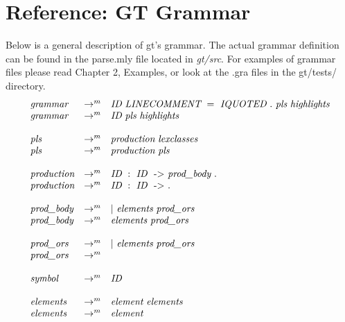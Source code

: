 \section{Reference: GT Grammar}

Below is a general description of gt's grammar. The actual grammar definition can be
found in the parse.mly file located in \textit{gt/src}. For examples of grammar files please
read Chapter 2, Examples, or look at the .gra files in the gt/tests/ directory. \\

\[
\begin{array}{lll}
\textit{grammar} & \to^m & \textit{ID}\ \textit{LINECOMMENT}\ =\ \textit{IQUOTED}\ .\ \textit{pls}\  \textit{highlights} \\
\textit{grammar} & \to^m & \textit{ID}\ \textit{pls}\ \textit{highlights} \\ \\
\textit{pls} & \to^m & \textit{production}\ \textit{lexclasses}\ \\
\textit{pls} & \to^m & \textit{production}\ \textit{pls} \\ \\ 
\textit{production} & \to^m & \textit{ID}\ :\ \textit{ID}\ \ \textnormal{->}\ \textit{prod\_body}\ . \\ 
\textit{production} & \to^m & \textit{ID}\ :\ \textit{ID}\ \ \textnormal{->}\ . \\ \\ 
\textit{prod\_body} & \to^m & |\ \textit{elements}\ \textit{prod\_ors} \\
\textit{prod\_body} & \to^m & \textit{elements}\ \textit{prod\_ors} \\\\
\textit{prod\_ors} & \to^m & |\ \textit{elements}\ \textit{prod\_ors} \\
\textit{prod\_ors} & \to^m & \ \\ \\
\textit{symbol} & \to^m & \textit{ID} \\ \\
\textit{elements} & \to^m & \textit{element}\ \textit{elements} \\
\textit{elements} & \to^m & \textit{element}\ \\ \\ 
\end{array}
\]



